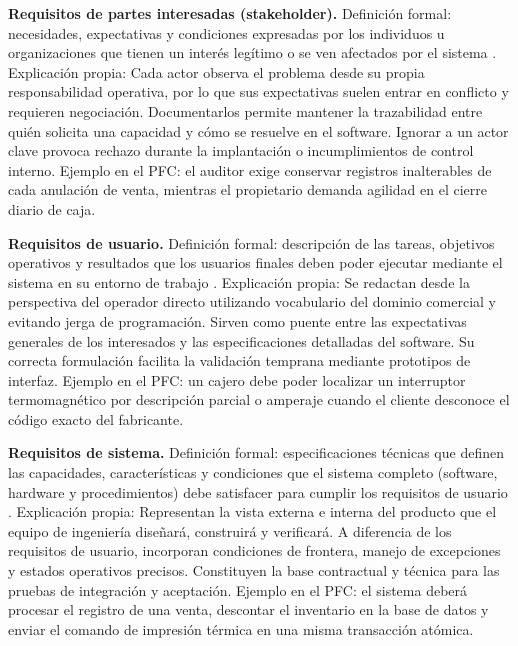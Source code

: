 \documentclass[onecolumn,12pt]{IEEEtran}
\begin{document}
	\textbf{Requisitos de partes interesadas (stakeholder).} Definici\'on formal: necesidades, expectativas y condiciones expresadas por los individuos u organizaciones que tienen un inter\'es leg\'itimo o se ven afectados por el sistema \cite{iso29148,pmbok7}. Explicaci\'on propia: Cada actor observa el problema desde su propia responsabilidad operativa, por lo que sus expectativas suelen entrar en conflicto y requieren negociaci\'on. Documentarlos permite mantener la trazabilidad entre qui\'en solicita una capacidad y c\'omo se resuelve en el software. Ignorar a un actor clave provoca rechazo durante la implantaci\'on o incumplimientos de control interno. Ejemplo en el PFC: el auditor exige conservar registros inalterables de cada anulaci\'on de venta, mientras el propietario demanda agilidad en el cierre diario de caja.
	
	\textbf{Requisitos de usuario.} Definici\'on formal: descripci\'on de las tareas, objetivos operativos y resultados que los usuarios finales deben poder ejecutar mediante el sistema en su entorno de trabajo \cite{iso29148,ireb2023}. Explicaci\'on propia: Se redactan desde la perspectiva del operador directo utilizando vocabulario del dominio comercial y evitando jerga de programaci\'on. Sirven como puente entre las expectativas generales de los interesados y las especificaciones detalladas del software. Su correcta formulaci\'on facilita la validaci\'on temprana mediante prototipos de interfaz. Ejemplo en el PFC: un cajero debe poder localizar un interruptor termomagn\'etico por descripci\'on parcial o amperaje cuando el cliente desconoce el c\'odigo exacto del fabricante.
	
	\textbf{Requisitos de sistema.} Definici\'on formal: especificaciones t\'ecnicas que definen las capacidades, caracter\'isticas y condiciones que el sistema completo (software, hardware y procedimientos) debe satisfacer para cumplir los requisitos de usuario \cite{iso29148,iso15288}. Explicaci\'on propia: Representan la vista externa e interna del producto que el equipo de ingenier\'ia dise\~nar\'a, construir\'a y verificar\'a. A diferencia de los requisitos de usuario, incorporan condiciones de frontera, manejo de excepciones y estados operativos precisos. Constituyen la base contractual y t\'ecnica para las pruebas de integraci\'on y aceptaci\'on. Ejemplo en el PFC: el sistema deber\'a procesar el registro de una venta, descontar el inventario en la base de datos y enviar el comando de impresi\'on t\'ermica en una misma transacci\'on at\'omica.
	
\end{document}
